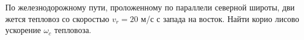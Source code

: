По железнодорожному пути, проложенному по параллели северной широты, дви
жется тепловоз со скоростью $v_r=20$ м/с с запада на восток. Найти корио
лисово ускорение $\omega_c$ тепловоза.
